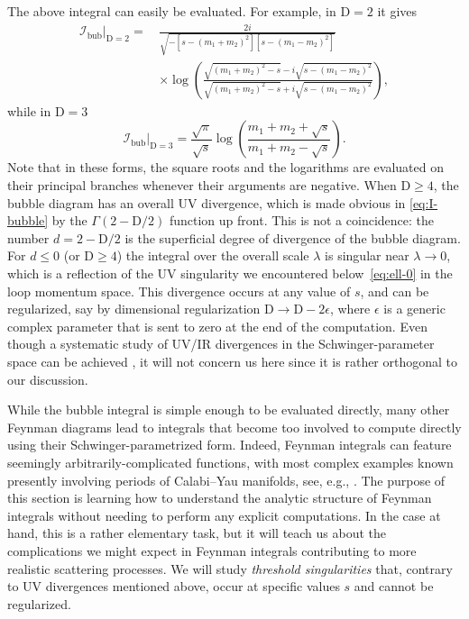 \documentclass[12pt]{article}
\numberwithin{figure}{section}
\def \be {\begin{equation}}
\def \ee {\end{equation}}
\def \nn {\nonumber}
\def \D {\mathrm{D}}
\def \leq {\leqslant}
\def \geq {\geqslant}
\def \I {\mathcal{I}}
\def \bubble {\mathrm{bub}}
\begin{document}
	The above integral can easily be evaluated. For example, in $\D=2$ it gives
	\begin{align}
	\label{eq:bub2d}
	\I_{\bubble}\big|_{\D=2} =\, &\frac{2i}{\sqrt{-[s - (m_1{+}m_2)^2][s-(m_1{-}m_2)^2]}}\nn
	\\
	&\times \log \left( \frac{\sqrt{(m_1{+}m_2)^2 -s } - i \sqrt{s - (m_1{-}m_2)^2}}{\sqrt{(m_1{+}m_2)^2 -s } + i \sqrt{s - (m_1{-}m_2)^2}} \right),
	\end{align}
	while in $\D=3$
	\be\label{eq:bub3d}
	\I_{\bubble}\big|_{\D=3} = \frac{\sqrt{\pi}}{\sqrt{s}} \log \left(\frac{m_1+m_2+\sqrt{s}}{m_1+m_2 - \sqrt{s}}\right).
	\ee
	Note that in these forms, the square roots and the logarithms are evaluated on their principal branches whenever their arguments are negative. When $\D \geq 4$, the bubble diagram has an overall UV divergence, which is made obvious in \eqref{eq:I-bubble} by the $\Gamma(2-\D/2)$ function up front. This is not a coincidence: the number $d = 2-\D/2$ is the superficial degree of divergence of the bubble diagram. For $d\leq 0$ (or $\D\geq 4$) the integral over the overall scale $\lambda$ is singular near $\lambda \to 0$, which is a reflection of the UV singularity we encountered below~\eqref{eq:ell-0} in the loop momentum space.
	This divergence occurs at any value of $s$, and can be regularized, say by dimensional regularization $\D \to \D - 2\epsilon$, where $\epsilon$ is a generic complex parameter that is sent to zero at the end of the computation. Even though a systematic study of UV/IR divergences in the Schwinger-parameter space can be achieved \cite{smirnov1991renormalization,zavialov2012renormalized,Arkani-Hamed:2022cqe}, it will not concern us here since it is rather orthogonal to our discussion.
	
	While the bubble integral is simple enough to be evaluated directly, many other Feynman diagrams lead to integrals that become too involved to compute directly using their Schwinger-parametrized form.
	Indeed, Feynman integrals can feature seemingly arbitrarily-complicated functions, with most complex examples known presently involving periods of Calabi--Yau manifolds, see, e.g., \cite{brown2010periods,BrownSchnetz2012,Bloch:2014qca,Bourjaily:2019hmc,Bonisch:2021yfw}. The purpose of this section is
	learning how to understand the analytic structure of Feynman integrals without needing to perform any explicit computations. In the case at hand, this is a rather elementary task, but it will teach us about the complications we might expect in Feynman integrals contributing to more realistic scattering processes. We will study \textit{threshold singularities} that, contrary to UV divergences mentioned above, occur at specific values $s$ and cannot be regularized.
	
\end{document}
